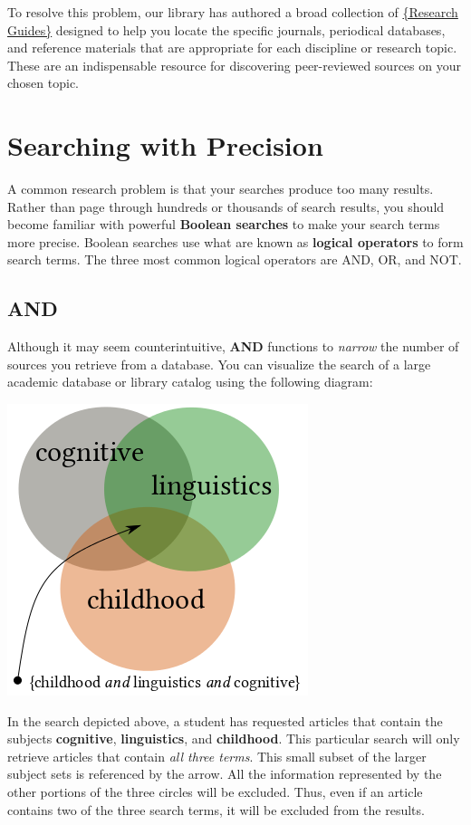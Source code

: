 {To resolve this problem, our library has authored a broad collection of 
\href{http://www.bu.edu/library/research/guides/research-guides}{\{Research 
Guides\}} designed to help you locate the specific journals, periodical 
databases, and reference materials that are appropriate for each discipline or 
research topic. These are an indispensable resource for discovering 
peer-reviewed sources on your chosen topic. 

\section{Searching with Precision}

A common research problem is that your searches produce too many results. 
Rather than page through hundreds or thousands of search results, you should 
become familiar with powerful \textbf{Boolean searches} to make your search 
terms more precise. Boolean searches use what are known as \textbf{logical 
operators} to form search terms. The three most common logical operators are 
AND, OR, and NOT. 

\subsection{AND}

Although it may seem counterintuitive, \textbf{AND} functions to \emph{narrow} 
the number of sources you retrieve from a database. You can visualize 
the search of a large academic database or library catalog using the following 
diagram:
 
\begin{center}
\includegraphics[width=.45\textwidth]{and3colors.png}
\end{center}

In the search depicted above, a student has requested articles that contain the 
subjects \textbf{cognitive}, \textbf{linguistics}, and \textbf{childhood}. 
This particular search will only retrieve articles that contain 
\emph{all three terms}. This small subset of the larger subject sets is 
referenced by the arrow. All the information represented by the other portions 
of the three circles will be excluded. Thus, even if an article contains two of 
the three search terms, it will be excluded from the results.

}

